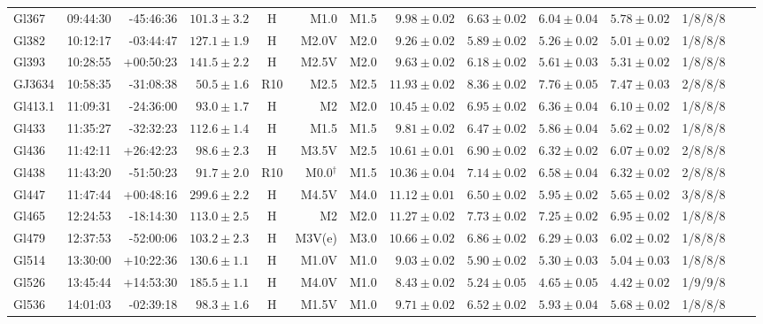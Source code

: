 \documentclass[referee]{aa}
\begin{document}
\begin{table}[h!]
{\begin{tabular}{ l r r r c r r r r r r r r r}
Gl367 & 09:44:30 & -45:46:36 & $101.3 \pm  3.2$ & H & M1.0 & M1.5 &  $9.98 \pm 0.02$ & $6.63 \pm 0.02$ & $6.04 \pm 0.04$ & $5.78 \pm 0.02$ & 1/8/8/8 \\
Gl382 & 10:12:17 & -03:44:47 & $127.1 \pm  1.9$ & H & M2.0V & M2.0 &  $9.26 \pm 0.02$ & $5.89 \pm 0.02$ & $5.26 \pm 0.02$ & $5.01 \pm 0.02$ & 1/8/8/8 \\
Gl393 & 10:28:55 & +00:50:23 & $141.5 \pm  2.2$ & H & M2.5V & M2.0 &  $9.63 \pm 0.02$ & $6.18 \pm 0.02$ & $5.61 \pm 0.03$ & $5.31 \pm 0.02$ & 1/8/8/8 \\
GJ3634 & 10:58:35 & -31:08:38 & $50.5 \pm  1.6$ & R10 & M2.5 & M2.5 &  $11.93 \pm 0.02$ & $8.36 \pm 0.02$ & $7.76 \pm 0.05$ & $7.47 \pm 0.03$ & 2/8/8/8 \\
Gl413.1 & 11:09:31 & -24:36:00 & $93.0 \pm  1.7$ & H & M2 & M2.0 &  $10.45 \pm 0.02$ & $6.95 \pm 0.02$ & $6.36 \pm 0.04$ & $6.10 \pm 0.02$ & 1/8/8/8 \\
Gl433 & 11:35:27 & -32:32:23 & $112.6 \pm  1.4$ & H & M1.5 & M1.5 &  $9.81 \pm 0.02$ & $6.47 \pm 0.02$ & $5.86 \pm 0.04$ & $5.62 \pm 0.02$ & 1/8/8/8 \\
Gl436 & 11:42:11 & +26:42:23 & $98.6 \pm  2.3$ & H & M3.5V & M2.5 &  $10.61 \pm 0.01$ & $6.90 \pm 0.02$ & $6.32 \pm 0.02$ & $6.07 \pm 0.02$ & 2/8/8/8 \\
Gl438 & 11:43:20 & -51:50:23 & $91.7 \pm  2.0$ & R10 & M0.0$^\dagger$ & M1.5 &  $10.36 \pm 0.04$ & $7.14 \pm 0.02$ & $6.58 \pm 0.04$ & $6.32 \pm 0.02$ & 2/8/8/8 \\
Gl447 & 11:47:44 & +00:48:16 & $299.6 \pm  2.2$ & H & M4.5V & M4.0 &  $11.12 \pm 0.01$ & $6.50 \pm 0.02$ & $5.95 \pm 0.02$ & $5.65 \pm 0.02$ & 3/8/8/8 \\
Gl465 & 12:24:53 & -18:14:30 & $113.0 \pm  2.5$ & H & M2 & M2.0 &  $11.27 \pm 0.02$ & $7.73 \pm 0.02$ & $7.25 \pm 0.02$ & $6.95 \pm 0.02$ & 1/8/8/8 \\
Gl479 & 12:37:53 & -52:00:06 & $103.2 \pm  2.3$ & H & M3V(e) & M3.0 &  $10.66 \pm 0.02$ & $6.86 \pm 0.02$ & $6.29 \pm 0.03$ & $6.02 \pm 0.02$ & 1/8/8/8 \\
Gl514 & 13:30:00 & +10:22:36 & $130.6 \pm  1.1$ & H & M1.0V & M1.0 &  $9.03 \pm 0.02$ & $5.90 \pm 0.02$ & $5.30 \pm 0.03$ & $5.04 \pm 0.03$ & 1/8/8/8 \\
Gl526 & 13:45:44 & +14:53:30 & $185.5 \pm  1.1$ & H & M4.0V & M1.0 &  $8.43 \pm 0.02$ & $5.24 \pm 0.05$ & $4.65 \pm 0.05$ & $4.42 \pm 0.02$ & 1/9/9/8 \\
Gl536 & 14:01:03 & -02:39:18 & $98.3 \pm  1.6$ & H & M1.5V & M1.0 &  $9.71 \pm 0.02$ & $6.52 \pm 0.02$ & $5.93 \pm 0.04$ & $5.68 \pm 0.02$ & 1/8/8/8 \\

\end{tabular}}
\end{table}
\end{document}

